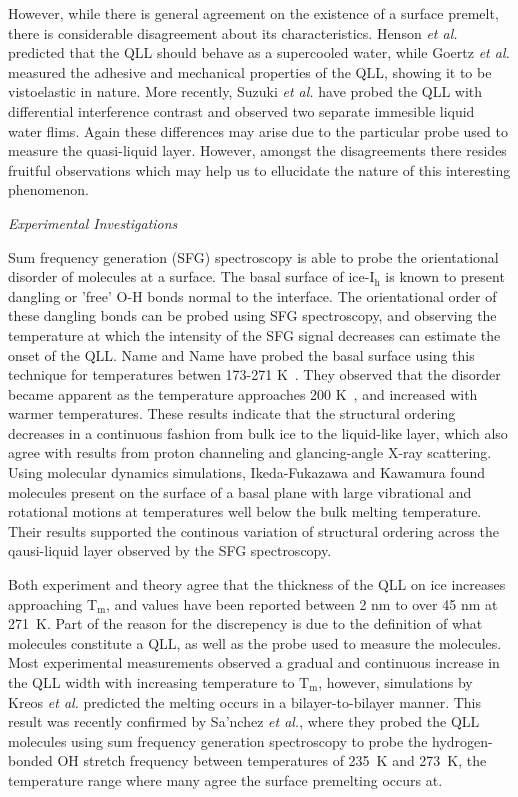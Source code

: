 However, while there is general agreement on the existence of a
surface premelt, there is considerable disagreement about its
characteristics. Henson \textit{et al.} predicted that the QLL should
behave as a supercooled water\cite{Henson2005}, while Goertz
\textit{et al.}  measured the adhesive and mechanical properties of
the QLL, showing it to be vistoelastic in nature.\cite{Goertz2009}
More recently, Suzuki \textit{et al.}  have probed the QLL with
differential interference contrast and observed two separate immesible
liquid water flims.\cite{Sazaki2012,Asakawa2016,Sazaki2013} Again
these differences may arise due to the particular probe used to
measure the quasi-liquid layer. However, amongst the disagreements
there resides fruitful observations which may help us to ellucidate
the nature of this interesting phenomenon. 


\begin{flushleft}
\textit{Experimental Investigations}
\end{flushleft}


Sum frequency generation (SFG) spectroscopy is able to probe the
orientational disorder of molecules at a surface. The basal surface of
ice-I$_\mathrm{h}$ is known to present dangling or 'free' O-H bonds
normal to the interface. The orientational order of these dangling
bonds can be probed using SFG spectroscopy, and observing the
temperature at which the intensity of the SFG signal decreases can
estimate the onset of the QLL. Name and Name have probed the basal
surface using this technique for temperatures betwen 173-271
K~.\cite{Wei2001,Wei2002} They observed that the disorder became apparent
as the temperature approaches 200 K~, and increased with warmer
temperatures.  These results indicate that the structural ordering
decreases in a continuous fashion from bulk ice to the liquid-like
layer, which also agree with results from proton channeling and
glancing-angle X-ray scattering.\cite{Golecki1978,Dosch1995} Using
molecular dynamics simulations, Ikeda-Fukazawa and Kawamura found
molecules present on the surface of a basal plane with large
vibrational and rotational motions at temperatures well below the bulk
melting temperature.\cite{Ikeda-Fukazawa2004} Their results supported
the continous variation of structural ordering across the qausi-liquid
layer observed by the SFG spectroscopy.



Both experiment and theory agree that the thickness of the QLL on ice
increases approaching T$_\mathrm{m}$, and values have been reported
between 2 nm to over 45 nm at 271~K. Part of the reason for the
discrepency is due to the definition of what molecules constitute a
QLL, as well as the probe used to measure the molecules. Most
experimental measurements observed a gradual and continuous increase
in the QLL width with increasing temperature to T$_\mathrm{m}$,
however, simulations by Kreos \textit{et al.} predicted the melting
occurs in a bilayer-to-bilayer manner. This result was recently
confirmed by Sa'nchez \textit{et al.}, where they probed the QLL
molecules using sum frequency generation spectroscopy to probe the
hydrogen-bonded OH stretch frequency between temperatures of 235~K
and 273~K, the temperature range where many agree the surface
premelting occurs at.

